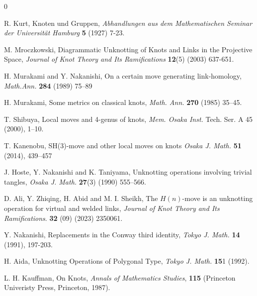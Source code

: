 \documentclass[12pt]{amsart}
\theoremstyle{remark}
\begin{document}



\begin{thebibliography}{0}

R. Kurt, Knoten und Gruppen, {\it Abhandlungen aus dem Mathematischen Seminar der Universität Hamburg} \textbf{5} (1927) 7-23.

M. Mroczkowski, Diagrammatic Unknotting of Knots and Links in the Projective Space, {\it Journal of Knot Theory and Its Ramifications} \textbf{12}(5) (2003) 637-651.

H. Murakami and Y. Nakanishi, On a certain move generating link-homology, {\it Math.Ann.} \textbf{284} (1989) 75–89

H. Murakami, Some metrics on classical knots, {\it Math. Ann.} \textbf{270} (1985) 35–45.

T. Shibuya, Local moves and 4-genus of knots, {\it Mem. Osaka Inst.} Tech. Ser. A 45 (2000), 1–10.

T. Kanenobu, SH(3)-move and other local moves on knots {\it Osaka J. Math.}
\textbf{51} (2014), 439–457

J. Hoste, Y. Nakanishi and K. Taniyama, Unknotting operations involving trivial tangles, {\it Osaka J. Math.} \textbf{27}(3) (1990) 555–566.

 D. Ali, Y. Zhiqing, H. Abid and  M. I. Sheikh, The $H(n)$-move is an unknotting operation for virtual and welded links, {\it Journal of Knot Theory and Its Ramifications}. {\bf 32} (09) (2023) 2350061.

Y. Nakanishi, Replacements in the Conway third identity, {\it Tokyo J. Math.} \textbf{14} (1991), 197-203.

H. Aida, Unknotting Operations of Polygonal Type, {\it Tokyo J. Math.} \textbf{15}1 (1992).

L. H. Kauffman, On Knots, {\it Annals of Mathematics Studies}, \textbf{115} (Princeton Univeristy Press, Princeton, 1987).


\end{thebibliography}
\end{document}
